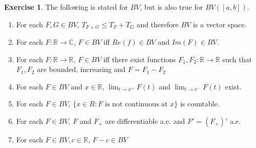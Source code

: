 \documentclass[12pt]{amsart}
\theoremstyle{definition}
\newtheorem{ex}[definition]{Exercise}
\newcommand{\C}{\mathbb{C}}
\newcommand{\R}{\mathbb{R}}
\begin{document}
	\begin{ex} The following is stated for $BV$, but is also true for $BV([a,b])$.
		
		\begin{enumerate} 
			\item For each $F,G \in BV$, $T_{F+G} \leq T_F + T_G$ and therefore $BV$ is a vector space. 
			\item For each $F: \R \rightarrow \C$, $F \in BV$ iff $Re(f) \in BV$ and $Im(F) \in BV$.
			\item For each $F:\R \rightarrow \R$, $F \in BV$ iff there exist functions $F_1,F_2:\R \rightarrow \R$ such that $F_1,F_2$ are bounded, increasing and $F=F_1-F_2$
			\item For each $F \in BV$ and $x \in \R$, $\lim_{t \rightarrow x^+}F(t)$ and $\lim_{t \rightarrow x^-}F(t)$ exist. 
			\item For each $F \in BV$, $\{x \in R: F \text{ is not continuous at }x\}$ is countable.
			\item For each $F \in BV$, $F$ and $F_+$ are differentiable a.e. and $F'=(F_+)'$ a.e.
			\item For each $F \in BV, c \in \R$, $F-c \in BV$
		\end{enumerate}
	\end{ex}
	
\end{document}
